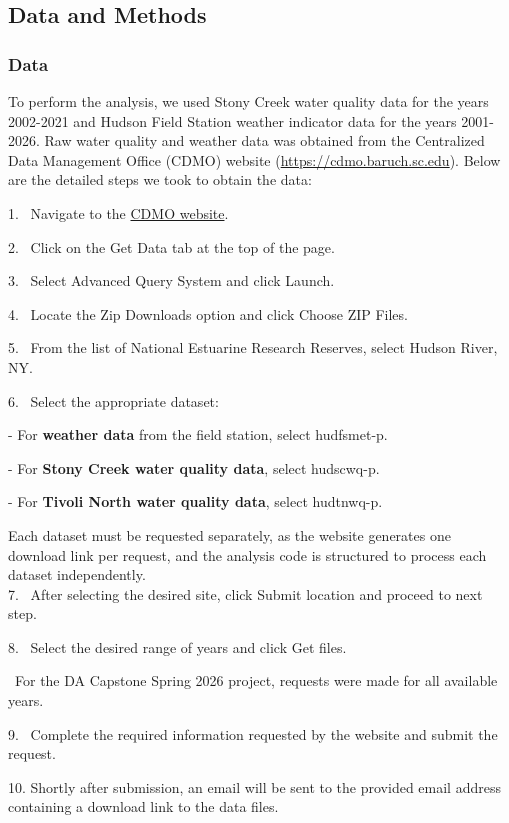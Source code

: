 \documentclass[
  letterpaper,
  DIV=11,
  numbers=noendperiod]{scrartcl}
\begin{document}
\subsection{Data and Methods}\label{data-and-methods}

\subsubsection{Data}\label{data}

To perform the analysis, we used Stony Creek water quality data for the
years 2002-2021 and Hudson Field Station weather indicator data for the
years 2001-2026. Raw water quality and weather data was obtained from
the Centralized Data Management Office (CDMO) website
(\href{https://cdmo.baruch.sc.edu/}{https://cdmo.baruch.sc.edu}). Below
are the detailed steps we took to obtain the data:

1.~ Navigate to the \href{https://cdmo.baruch.sc.edu/}{CDMO website}.

2.~ Click on the Get Data tab at the top of the page.

3.~ Select Advanced Query System and click Launch.

4.~ Locate the Zip Downloads option and click Choose ZIP Files.

5.~ From the list of National Estuarine Research Reserves, select Hudson
River, NY.

6.~ Select the appropriate dataset:

- For \textbf{weather data} from the field station, select hudfsmet-p.

- For \textbf{Stony Creek water quality data}, select hudscwq-p.

- For \textbf{Tivoli North water quality data}, select hudtnwq-p.

Each dataset must be requested separately, as the website generates one
download link per request, and the analysis code is structured to
process each dataset independently.\\
7.~ After selecting the desired site, click Submit location and proceed
to next step.

8.~ Select the desired range of years and click Get files.

~For the DA Capstone Spring 2026 project, requests were made for all
available years.

9.~ Complete the required information requested by the website and
submit the request.

10. Shortly after submission, an email will be sent to the provided
email address containing a download link to the data files.
\end{document}
